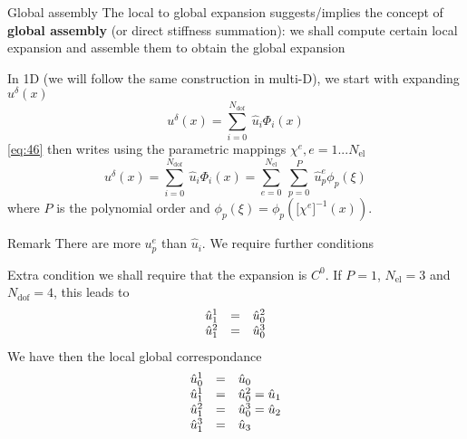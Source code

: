 \begin{frame}{Global assembly}
  The local to global expansion suggests/implies the concept of \textbf{global
    assembly} (or direct stiffness summation): we shall compute
  certain local expansion and assemble them to obtain the global expansion

  In 1D (we will follow the same construction in multi-D), we start with expanding $u^\delta(x)$  
  \begin{equation}
    \label{eq:46}
    u^\delta(x) = \sum_{i=0}^{N_\text{dof}}\ \hat{u}_i \Phi_i(x)
  \end{equation}
  \eqref{eq:46} then writes using the parametric mappings $\chi^e, e=1...N_{\text{el}}$ 
  \begin{equation}
    \label{eq:45}
    u^\delta(x) = \sum_{i=0}^{N_\text{dof}}\ \hat{u}_i \Phi_i(x) = \sum_{e=0}^{N_\text{el}}\ \sum_{p=0}^{P}\ \hat{u}^e_p \phi_p(\xi)
  \end{equation}
  where $P$ is the polynomial order and $\phi_p(\xi) = \phi_p( \Big[ \chi^e\Big]^{-1} (x) )$.

  \begin{block}{Remark}
    There are more $u^e_p$ than $\hat{u}_i$. We require further conditions
  \end{block}
\end{frame}

\begin{frame}{Extra condition}
  we shall require that the expansion is $C^0$. If $P=1$, $N_{\text{el}} = 3$ and $N_{\text{dof}} = 4$, this leads to 
  \begin{equation}
    \label{eq:47}
    \begin{array}[c]{rcl}
      \hat{u}^1_1 &=& \hat{u}^2_0 \\
      \hat{u}^2_1 &=& \hat{u}^3_0 
    \end{array}
  \end{equation}
  We have  then the local global correspondance
  \begin{equation}
    \label{eq:48}
    \begin{array}[c]{rcl}
      \hat{u}^1_0 &=& \hat{u}_0 \\
      \hat{u}^1_1 &=& \hat{u}^2_0 = \hat{u}_1\\
      \hat{u}^2_1 &=& \hat{u}^3_0  = \hat{u}_2\\
      \hat{u}^3_1 &=& \hat{u}_3 \\
    \end{array}
  \end{equation}
\end{frame}



